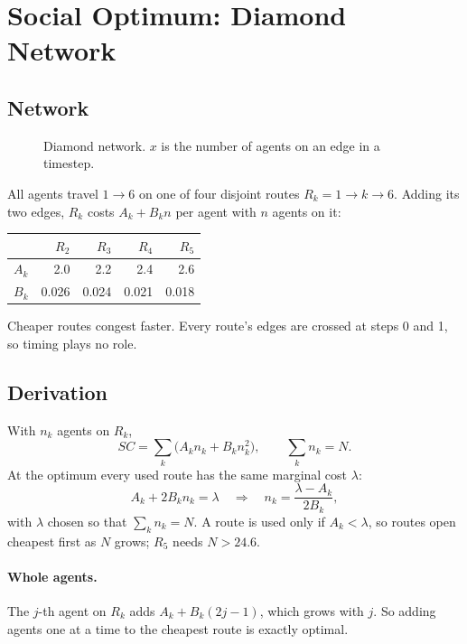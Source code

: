 \documentclass[11pt]{article}
\begin{document}
\section{Social Optimum: Diamond Network}

\subsection{Network}

\begin{figure}[H]
  \centering
  
  \caption{Diamond network. $x$ is the number of agents on an edge in a timestep.}
\end{figure}

All agents travel $1 \to 6$ on one of four disjoint routes $R_k = 1 \to k \to 6$. Adding its two edges,
$R_k$ costs $A_k + B_k n$ per agent with $n$ agents on it:

\begin{center}
\begin{tabular}{@{}lrrrr@{}}
\toprule
& $R_2$ & $R_3$ & $R_4$ & $R_5$ \\
\midrule
$A_k$ & 2.0   & 2.2   & 2.4   & 2.6   \\
$B_k$ & 0.026 & 0.024 & 0.021 & 0.018 \\
\bottomrule
\end{tabular}
\end{center}

Cheaper routes congest faster. Every route's edges are crossed at steps 0 and 1, so timing plays no role.

\subsection{Derivation}

With $n_k$ agents on $R_k$,
\[
  SC = \sum_k \bigl(A_k n_k + B_k n_k^2\bigr), \qquad \sum_k n_k = N.
\]
At the optimum every used route has the same marginal cost $\lambda$:
\[
  A_k + 2B_k n_k = \lambda \quad\Longrightarrow\quad n_k = \frac{\lambda - A_k}{2B_k},
\]
with $\lambda$ chosen so that $\sum_k n_k = N$. A route is used only if $A_k < \lambda$, so routes open
cheapest first as $N$ grows; $R_5$ needs $N > 24.6$.

\paragraph{Whole agents.} The $j$-th agent on $R_k$ adds $A_k + B_k(2j - 1)$, which grows with $j$. So
adding agents one at a time to the cheapest route is exactly optimal.
\end{document}
